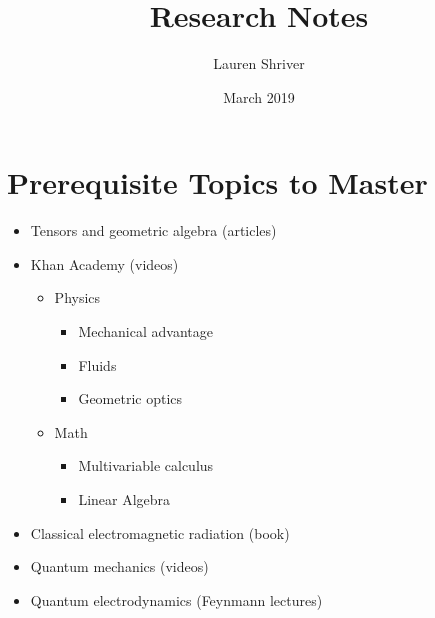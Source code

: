 \documentclass[a4paper]{article}
\title{Research Notes}
\author{Lauren Shriver}
\date{March 2019}
\begin{document}
\maketitle

\section*{Prerequisite Topics to Master}
\begin{itemize}
    \item  Tensors and geometric algebra (articles)
    \item Khan Academy (videos)
        \begin{itemize}
            \item Physics
                \begin{itemize}
                    \item Mechanical advantage
                    \item Fluids
                    \item Geometric optics
                \end{itemize}
            \item Math
                \begin{itemize}
                    \item Multivariable calculus
                    \item Linear Algebra
                \end{itemize}
        \end{itemize}
    \item Classical electromagnetic radiation (book)
    \item Quantum mechanics (videos)
    \item Quantum electrodynamics (Feynmann lectures) 
\end{itemize}
\end{document}
